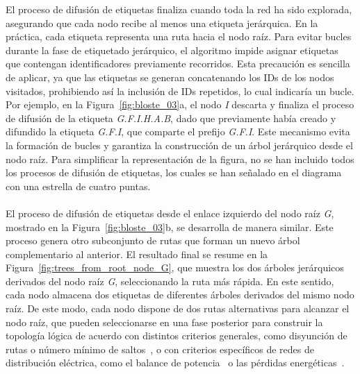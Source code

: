 El proceso de difusión de etiquetas finaliza cuando toda la red ha sido explorada, asegurando que cada nodo recibe al menos una etiqueta jerárquica. En la práctica, cada etiqueta representa una ruta hacia el nodo raíz. Para evitar bucles durante la fase de etiquetado jerárquico, el algoritmo impide asignar etiquetas que contengan identificadores previamente recorridos. Esta precaución es sencilla de aplicar, ya que las etiquetas se generan concatenando los IDs de los nodos visitados, prohibiendo así la inclusión de IDs repetidos, lo cual indicaría un bucle. Por ejemplo, en la Figura~\ref{fig:bloste_03}a, el nodo \textit{I} descarta y finaliza el proceso de difusión de la etiqueta \textit{G.F.I.H.A.B}, dado que previamente había creado y difundido la etiqueta \textit{G.F.I}, que comparte el prefijo \textit{G.F.I}. Este mecanismo evita la formación de bucles y garantiza la construcción de un árbol jerárquico desde el nodo raíz. Para simplificar la representación de la figura, no se han incluido todos los procesos de difusión de etiquetas, los cuales se han señalado en el diagrama con una estrella de cuatro puntas.\\
\\
El proceso de difusión de etiquetas desde el enlace izquierdo del nodo raíz \textit{G}, mostrado en la Figura~\ref{fig:bloste_03}b, se desarrolla de manera similar. Este proceso genera otro subconjunto de rutas que forman un nuevo árbol complementario al anterior. El resultado final se resume en la Figura~\ref{fig:trees_from_root_node_G}, que muestra los dos árboles jerárquicos derivados del nodo raíz \textit{G}, seleccionando la ruta más rápida. En este sentido, cada nodo almacena dos etiquetas de diferentes árboles derivados del mismo nodo raíz. De este modo, cada nodo dispone de dos rutas alternativas para alcanzar el nodo raíz, que pueden seleccionarse en una fase posterior para construir la topología lógica de acuerdo con distintos criterios generales, como disyunción de rutas o número mínimo de saltos~\cite{Lopez-Pajares19,rojas2021outperforming}, o con criterios específicos de redes de distribución eléctrica, como el balance de potencia~\cite{Zishan2024} o las pérdidas energéticas~\cite{Zhang2024}.


